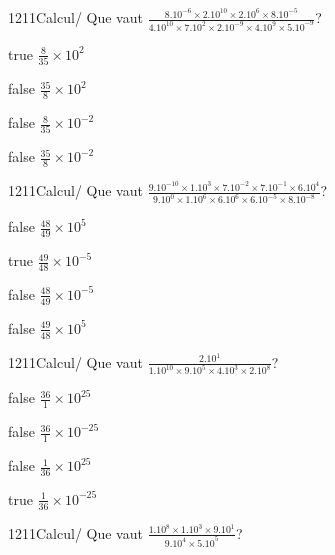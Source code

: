             \begin{question}{1211}{Calcul}{}{/}
                Que vaut $\frac{8.10^{-6}\times 2.10^{10}\times 2.10^{6}\times 8.10^{-5}}{4.10^{10}\times 7.10^{2}\times 2.10^{-9}\times 4.10^{9}\times 5.10^{-9}}$?
            \end{question}
            \begin{reponses}
                \item[true] $\frac{8}{35}\times 10^{2}$
                \item[false] $\frac{35}{8}\times 10^{2}$
                \item[false] $\frac{8}{35}\times 10^{-2}$
                \item[false] $\frac{35}{8}\times 10^{-2}$
            \end{reponses}
            \begin{question}{1211}{Calcul}{}{/}
                Que vaut $\frac{9.10^{-10}\times 1.10^{3}\times 7.10^{-2}\times 7.10^{-1}\times 6.10^{4}}{9.10^{0}\times 1.10^{6}\times 6.10^{6}\times 6.10^{-5}\times 8.10^{-8}}$?
            \end{question}
            \begin{reponses}
                \item[false] $\frac{48}{49}\times 10^{5}$
                \item[true] $\frac{49}{48}\times 10^{-5}$
                \item[false] $\frac{48}{49}\times 10^{-5}$
                \item[false] $\frac{49}{48}\times 10^{5}$
            \end{reponses}
            \begin{question}{1211}{Calcul}{}{/}
                Que vaut $\frac{2.10^{1}}{1.10^{10}\times 9.10^{5}\times 4.10^{3}\times 2.10^{8}}$?
            \end{question}
            \begin{reponses}
                \item[false] $\frac{36}{1}\times 10^{25}$
                \item[false] $\frac{36}{1}\times 10^{-25}$
                \item[false] $\frac{1}{36}\times 10^{25}$
                \item[true] $\frac{1}{36}\times 10^{-25}$
            \end{reponses}
            \begin{question}{1211}{Calcul}{}{/}
                Que vaut $\frac{1.10^{8}\times 1.10^{3}\times 9.10^{1}}{9.10^{4}\times 5.10^{5}}$?
            \end{question}
